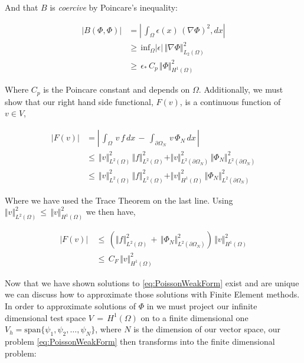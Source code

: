 \documentclass[10pt]{report}
\numberwithin{equation}{section}
\begin{document}
\noindent
And that $B$ is \textit{coercive} by Poincare's inequality:

\begin{align*}
|B(\Phi, \Phi)| &= \left\vert \, \int_{\Omega} \epsilon(x) \, \left( \nabla \Phi \right)^{2}, dx \right\vert  \\
&\geq \,\text{inf}_{\Omega} | \epsilon | \, \Vert \nabla \Phi \Vert^{2}_{L_{2}(\Omega)} \\
&\geq \,  \epsilon_{*} \, C_{p}  \, \Vert \Phi \Vert_{H^{1}(\Omega)}^{2}
\end{align*}

\noindent
Where $C_{p}$ is the Poincare constant and depends on $\Omega$.  Additionally, we must show that our right hand side functional, $F(v)$, is a continuous function of $v \in V$,

\begin{align*}
|F(v)| &= \left\vert  \, \int_{\Omega} \, v \,  f  \, dx   \, - \, \int_{\partial \Omega_{N}} \,  v  \, \Phi_{N} \, dx \, \right\vert \\
&\leq \, \Vert v \Vert_{L^{2}(\Omega)}^{2} \, \Vert f \Vert_{L^{2}(\Omega)}^{2} + \Vert v \Vert_{L^{2}(\partial \Omega_{N})}^{2} \, \Vert \Phi_{N} \Vert_{L^{2}(\partial \Omega_{N})}^{2} \\
&\leq \, \Vert v \Vert_{L^{2}(\Omega)}^{2} \, \Vert f \Vert_{L^{2}(\Omega)}^{2} + \Vert v \Vert_{H^{1}(\Omega)}^{2} \, \Vert \Phi_{N} \Vert_{L^{2}(\partial \Omega_{N})}^{2} 
\end{align*}

\noindent
Where we have used the Trace Theorem on the last line.  Using $\Vert v \Vert_{L^{2}(\Omega)}^{2} \, \leq \, \Vert v \Vert_{H^{1}(\Omega)}^{2}$ we then have,


\begin{align*}
|F(v)| \, & \leq  \, \left(  \Vert f \Vert_{L^{2}(\Omega)}^{2} \, + \, 
\Vert \Phi_{N} \Vert_{L^{2}(\partial \Omega_{N})}^{2} \right) \, \Vert v \Vert_{H^{1}(\Omega)}^{2} \\
&\leq  \, C_{F}  \, \Vert v \Vert_{H^{1}(\Omega)}^{2}
\end{align*}


Now that we have shown solutions to \eqref{eq:PoissonWeakForm} exist and are unique we can discuss how to approximate those solutions with Finite Element methods.   In order to approximate solutions of $\Phi$ in we must project our infinite dimensional test space $V \, = \, H^{1}(\Omega)$ on to a finite dimensional one $V_{h} = \text{span}\{\psi_{1}, \psi_{2}, \ldots , \psi_{N}\}$, where $N$ is the dimension of our vector space, our problem \eqref{eq:PoissonWeakForm} then transforms into the finite dimensional problem:
\end{document}

